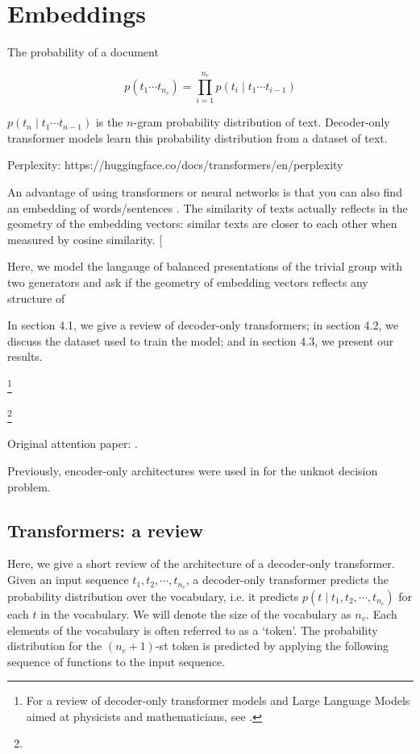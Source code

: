 
\section{Embeddings}

The probability of a document 

\[
p(t_1 \cdots t_{n_c}) = \prod\limits_{i=1}^{n_c} p (t_{i} \mid t_{1} \cdots t_{i-1}) 
\]

$p (t_{n} \mid t_{1} \cdots t_{n-1}) $ is the $n$-gram probability distribution of text. Decoder-only transformer models learn this probability distribution from a dataset of text. 
\newline

Perplexity: https://huggingface.co/docs/transformers/en/perplexity

An advantage of using transformers or neural networks is that you can also find an embedding of words/sentences \cite{Bengio:2003}. The similarity of texts actually reflects in the geometry of the embedding vectors: similar texts are closer to each other when measured by cosine similarity. [

Here, we model the langauge of balanced presentations of the trivial group with two generators and ask if the geometry of embedding vectors reflects any structure of 

In section 4.1, we give a review of decoder-only transformers; in section 4.2, we discuss the dataset used to train the model; and in section 4.3, we present our results. 

\footnote{For a review of decoder-only transformer models and Large Language Models aimed at physicists and mathematicians, see \cite{douglas2023large,}.}

\footnote{}

Original attention paper: \cite{vaswani2023attention}.

Previously, encoder-only architectures were used in \cite{gukov2020learning} for the unknot decision problem. 


\subsection{Transformers: a review}

Here, we give a short review of the architecture of a decoder-only transformer. Given an input sequence $t_1, t_2, \cdots, t_{n_c}$, a decoder-only transformer predicts the probability distribution over the vocabulary, i.e. it predicts $p(t \mid t_1, t_2, \cdots, t_{n_c})$ for each $t$ in the vocabulary. We will denote the size of the vocabulary as $n_v$. Each elements of the vocabulary is often referred to as a `token'. The probability distribution for the $(n_c+1)$-st token is predicted by applying the following sequence of functions to the input sequence.

